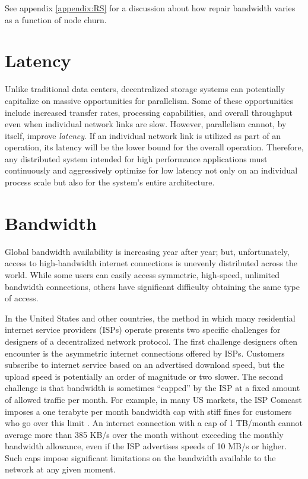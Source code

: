\documentclass[11pt,fleqn,openany]{book}
\begin{document}
See appendix \ref{appendix:RS} for a discussion about how repair bandwidth
varies as a function of node churn.

\section{Latency}

Unlike traditional data centers,
decentralized storage systems can potentially capitalize on
massive opportunities for parallelism.
Some of these opportunities include increased transfer rates, processing
capabilities, and overall throughput even when individual
network links are slow. However, parallelism cannot, by itself, improve {\em
latency}. If an individual network link is utilized as part of an operation,
its latency will be the lower bound for the overall operation.
Therefore, any distributed system
intended for high performance applications must continuously and aggressively
optimize for low latency not only on an individual process scale but also for
the system's entire architecture.

\section{Bandwidth}\label{sec:req-bandwidth}

Global bandwidth availability is increasing year after year; but, unfortunately,
access to
high-bandwidth internet connections is unevenly distributed across the world.
While some users can easily access symmetric, high-speed, unlimited bandwidth
connections, others have significant difficulty obtaining the same type of access.

In the United States and other countries,
the method in which many residential internet service providers (ISPs)
operate presents two specific challenges for designers of a
decentralized network protocol. The first challenge designers often encounter is
the asymmetric internet connections offered by ISPs.
Customers subscribe to internet service
based on an advertised download speed, but the upload speed is potentially an
order of magnitude or two slower. The second challenge is that bandwidth is
sometimes ``capped'' by the ISP at a fixed amount of allowed traffic per month.
For example, in many
US markets, the ISP Comcast imposes a one terabyte per month bandwidth cap
with stiff fines for customers who go over this limit \cite{comcast-cap}.
An internet connection with a cap of 1 TB/month cannot average more than
385 KB/s over the month without exceeding the monthly bandwidth allowance,
even if the ISP advertises speeds of 10 MB/s or higher.
Such caps impose
significant limitations on the bandwidth available to the network
at any given moment.
\end{document}
